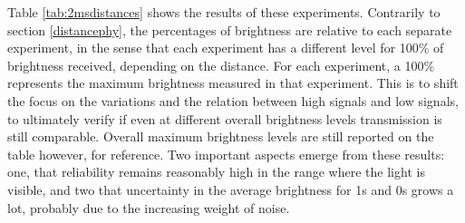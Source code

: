Table \ref{tab:2msdistances} shows the results of these experiments.
Contrarily to section \ref{distancephy}, the percentages of brightness are relative to each separate experiment, in the sense that each experiment has a different level for 100\% of brightness received, depending on the distance.
For each experiment, a 100\% represents the maximum brightness measured in that experiment.
This is to shift the focus on the variations and the relation between high signals and low signals, to ultimately verify if even at different overall brightness levels transmission is still comparable.
Overall maximum brightness levels are still reported on the table however, for reference.
Two important aspects emerge from these results: one, that reliability remains reasonably high in the range where the light is visible, and two that uncertainty in the average brightness for 1s and 0s grows a lot, probably due to the increasing weight of noise.


